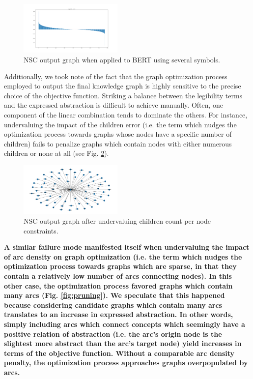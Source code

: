 \begin{figure}[h]
    \centering
    \includegraphics[width=0.45\textwidth]{img/spectrum.png}
    \caption{NSC output graph when applied to BERT using several symbols.}\label{fig:spectrum}
\end{figure}

Additionally, we took note of the fact that the graph optimization process employed to output the final knowledge graph is highly sensitive to the precise choice of the objective function. Striking a balance between the legibility terms and the expressed abstraction is difficult to achieve manually. Often, one component of the linear combination tends to dominate the others. For instance, undervaluing the impact of the children error (i.e. the term which nudges the optimization process towards graphs whose nodes have a specific number of children) fails to penalize graphs which contain nodes with either numerous children or none at all (see Fig. \ref{fig:children}).

\begin{figure}[h]
    \centering
    \includegraphics[width=0.45\textwidth]{img/too_much_pruning.png}
    \caption{NSC output graph after undervaluing children count per node constraints.}\label{fig:children}
\end{figure}

\textbf{A similar failure mode manifested itself when undervaluing the impact of arc density on graph optimization (i.e. the term which nudges the optimization process towards graphs which are sparse, in that they contain a relatively low number of arcs connecting nodes). In this other case, the optimization process favored graphs which contain many arcs (Fig. \ref{fig:pruning}). We speculate that this happened because considering candidate graphs which contain many arcs translates to an increase in expressed abstraction. In other words, simply including arcs which connect concepts which seemingly have a positive relation of abstraction (i.e. the arc's origin node is the slightest more abstract than the arc's target node) yield increases in terms of the objective function. Without a comparable arc density penalty, the optimization process approaches graphs overpopulated by arcs.}

